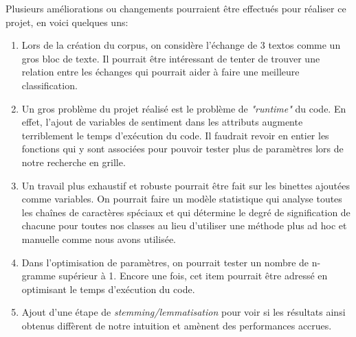 Plusieurs améliorations ou changements pourraient être effectués pour réaliser ce projet, en voici quelques uns:

\begin{enumerate}
\item Lors de la création du corpus, on considère l'échange de 3 textos comme un gros bloc de texte. Il pourrait être intéressant de tenter de trouver une relation entre les échanges qui pourrait aider à faire une meilleure classification.

\item Un gros problème du projet réalisé est le problème de \emph{"runtime"} du code. En effet, l'ajout de variables de sentiment dans les attributs augmente terriblement le temps d'exécution du code. Il faudrait revoir en entier les fonctions qui y sont associées pour pouvoir tester plus de paramètres lors de notre recherche en grille.

\item Un travail plus exhaustif et robuste pourrait être fait sur les binettes ajoutées comme variables. On pourrait faire un modèle statistique qui analyse toutes les chaînes de caractères spéciaux et qui détermine le degré de signification de chacune pour toutes nos classes au lieu d'utiliser une méthode plus ad hoc et manuelle comme nous avons utilisée.

\item Dans l'optimisation de paramètres, on pourrait tester un nombre de n-gramme supérieur à 1. Encore une fois, cet item pourrait être adressé en optimisant le temps d'exécution du code.

\item Ajout d'une étape de \emph{stemming/lemmatisation} pour voir si les résultats ainsi obtenus diffèrent de notre intuition et amènent des performances accrues.
\end{enumerate}